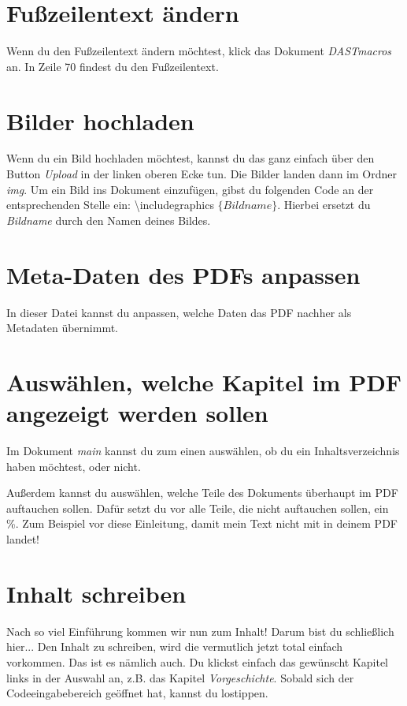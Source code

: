 \section{Fußzeilentext ändern}
Wenn du den Fußzeilentext ändern möchtest, klick das Dokument \emph{DASTmacros} an. In Zeile 70 findest du den Fußzeilentext.

\section{Bilder hochladen}
Wenn du ein Bild hochladen möchtest, kannst du das ganz einfach über den Button \emph{Upload} in der linken oberen Ecke tun. Die Bilder landen dann im Ordner \textit{img}. Um ein Bild ins Dokument einzufügen, gibst du folgenden Code an der entsprechenden Stelle ein: \textbackslash includegraphics $\{Bildname\}$. Hierbei ersetzt du \emph{Bildname} durch den Namen deines Bildes.

\section{Meta-Daten des PDFs anpassen}
In dieser Datei kannst du anpassen, welche Daten das PDF nachher als Metadaten übernimmt.

\section{Auswählen, welche Kapitel im PDF angezeigt werden sollen}
Im Dokument \emph{main} kannst du zum einen auswählen, ob du ein Inhaltsverzeichnis haben möchtest, oder nicht. \newline

Außerdem kannst du auswählen, welche Teile des Dokuments überhaupt im PDF auftauchen sollen. Dafür setzt du vor alle Teile, die nicht auftauchen sollen, ein \%. Zum Beispiel vor diese Einleitung, damit mein Text nicht mit in deinem PDF landet!


\section{Inhalt schreiben}
Nach so viel Einführung kommen wir nun zum Inhalt! Darum bist du schließlich hier... Den Inhalt zu schreiben, wird die vermutlich jetzt total einfach vorkommen. Das ist es nämlich auch. Du klickst einfach das gewünscht Kapitel links in der Auswahl an, z.B. das Kapitel \emph{Vorgeschichte}. Sobald sich der Codeeingabebereich geöffnet hat, kannst du lostippen.

